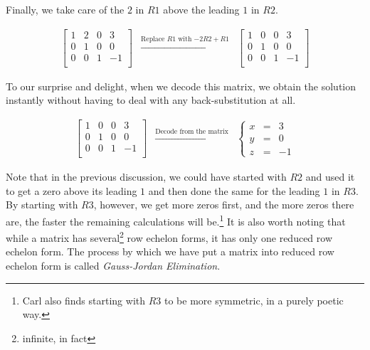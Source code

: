 \documentclass{ximera}
\begin{document}
Finally, we take care of the $2$ in $R1$ above the leading $1$ in $R2$.

\[ \begin{array}{ccc}

\left[ \begin{array}{rrr|r} 
1 & 2 & 0 & 3 \\ 
0 & 1 & 0 & 0 \\ 
0 & 0 &1 & -1 \\ 
\end{array} \right]   
& 
\xrightarrow{\text{Replace $R1$ with $-2R2+R1$}}
& 
\left[ \begin{array}{rrr|r} 
1 & 0 & 0 & 3 \\ 
0 & 1 & 0 & 0 \\ 
0 & 0 &1 & -1 \\ 
\end{array} \right]  

\end{array}\]

To our surprise and delight, when we decode this matrix, we obtain the solution instantly without having to deal with any back-substitution at all.

\[ \begin{array}{ccc}

\left[ \begin{array}{rrr|r} 
1 & 0 & 0 & 3 \\ 
0 & 1 & 0 & 0 \\ 
0 & 0 &1 & -1 \\ 
\end{array} \right]  
 
& 
\xrightarrow{\text{Decode from the matrix}} 
& 
\left\{ \begin{array}{rcr} 
x & = & 3 \\ 
y & = & 0 \\ 
z & = & -1 \end{array} \right.

\end{array}\]

Note that in the previous discussion, we could have started with $R2$ and used it to get a zero above its leading $1$ and then done the same for the leading $1$ in $R3$.  By starting with $R3$, however, we get more zeros first, and the more zeros there are, the faster the remaining calculations will be.\footnote{Carl also finds starting with $R3$ to be more symmetric, in a purely poetic way.}  It is also worth noting that while a matrix has several\footnote{infinite, in fact} row echelon forms, it has only one reduced row echelon form.  The process by which we have put a matrix into reduced row echelon form is called   \textit{Gauss-Jordan Elimination}.
\end{document}
